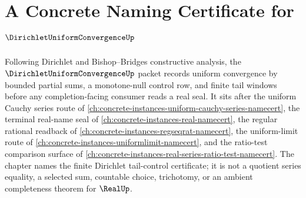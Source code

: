 \chapter{A Concrete Naming Certificate for $\DirichletUniformConvergenceUp$}
\label{ch:concrete-instances-dirichlet-uniform-convergence-namecert}

Following Dirichlet and Bishop--Bridges constructive analysis, the $\DirichletUniformConvergenceUp$ packet records uniform convergence by bounded partial sums, a monotone-null control row, and finite tail windows before any completion-facing consumer reads a real seal. It sits after the uniform Cauchy series route of \autoref{ch:concrete-instances-uniform-cauchy-series-namecert}, the terminal real-name seal of \autoref{ch:concrete-instances-real-namecert}, the regular rational readback of \autoref{ch:concrete-instances-regseqrat-namecert}, the uniform-limit route of \autoref{ch:concrete-instances-uniformlimit-namecert}, and the ratio-test comparison surface of \autoref{ch:concrete-instances-real-series-ratio-test-namecert}. The chapter names the finite Dirichlet tail-control certificate; it is not a quotient series equality, a selected sum, countable choice, trichotomy, or an ambient completeness theorem for $\RealUp$.

